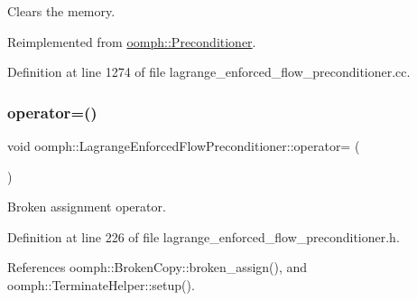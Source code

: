 Clears the memory. 



Reimplemented from \hyperlink{classoomph_1_1Preconditioner_a46c31c416829bedcd9db238431262027}{oomph\+::\+Preconditioner}.



Definition at line 1274 of file lagrange\+\_\+enforced\+\_\+flow\+\_\+preconditioner.\+cc.

\mbox{\label{classoomph_1_1LagrangeEnforcedFlowPreconditioner_a86ada15275cece9fc9529c6a9b3373d1}} 
\subsubsection{\texorpdfstring{operator=()}{operator=()}}
{\footnotesize\ttfamily void oomph\+::\+Lagrange\+Enforced\+Flow\+Preconditioner\+::operator= (\begin{DoxyParamCaption}\item[{const \hyperlink{classoomph_1_1LagrangeEnforcedFlowPreconditioner}{Lagrange\+Enforced\+Flow\+Preconditioner} \&}]{ }\end{DoxyParamCaption})\hspace{0.3cm}{\ttfamily [inline]}}



Broken assignment operator. 



Definition at line 226 of file lagrange\+\_\+enforced\+\_\+flow\+\_\+preconditioner.\+h.



References oomph\+::\+Broken\+Copy\+::broken\+\_\+assign(), and oomph\+::\+Terminate\+Helper\+::setup().

\mbox{\label{classoomph_1_1LagrangeEnforcedFlowPreconditioner_a519940fc2faee5faac00b80004f3edea}} 
